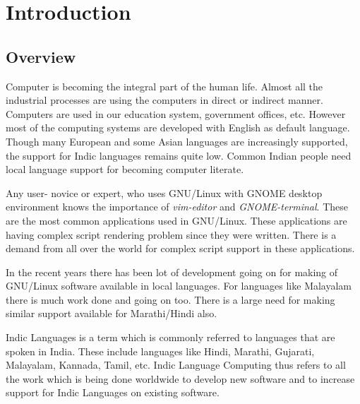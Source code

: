 %

\chapter{Introduction}
\section{Overview}

Computer is becoming the integral part of the human life. Almost all the industrial processes are using the computers in direct or indirect manner. Computers are used in our education system, government offices, etc. However most of the computing systems are developed with English as default language. Though many European and some Asian languages are increasingly supported, the support for Indic languages remains quite low. Common Indian people need local language support for becoming computer literate.

Any user- novice or expert, who uses GNU/Linux with GNOME desktop environment knows the importance of \textit{vim-editor} and \textit{GNOME-terminal}. These are the most common  applications used in GNU/Linux. These applications are having complex script rendering problem since they were written. There is a demand from all over the world for complex script support in these applications.

In the recent years there has been lot of development going on for making of GNU\slash Linux software available in local languages. For languages like Malayalam there is much work done and going on too. There is a large need for making similar support available for Marathi/Hindi also.


Indic Languages is a term which is commonly referred to languages that are spoken in India. These include languages like Hindi, Marathi, Gujarati, Malayalam, Kannada, Tamil, etc. Indic Language Computing thus refers to all the work which is being done worldwide to develop new software and to increase support for Indic Languages on existing software.


